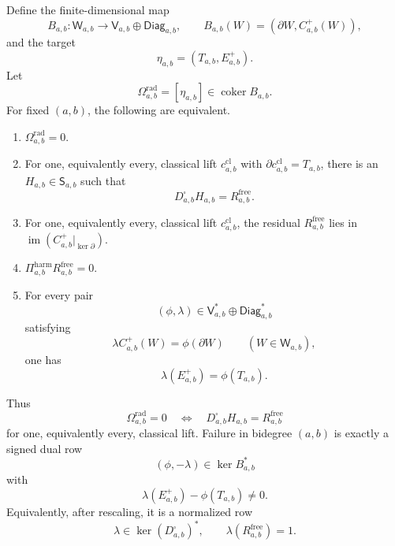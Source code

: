 \begin{prop}
\label{prop:app-radial-dual-potential-obstruction}
  Define the finite-dimensional map
  \[
    B_{a,b}\colon\mathsf W_{a,b}\longrightarrow
    \mathsf V_{a,b}\oplus\mathsf{Diag}_{a,b},
    \qquad
    B_{a,b}(W)=(\partial W,C^+_{a,b}(W)),
  \]
  and the target
  \[
    \eta_{a,b}=(T_{a,b},E^+_{a,b}).
  \]
  Let
  \[
    \Omega^{\mathrm{rad}}_{a,b}
    =
    [\eta_{a,b}]\in\operatorname{coker}B_{a,b}.
  \]
  For fixed \((a,b)\), the following are equivalent.
  \begin{enumerate}
    \item \(\Omega^{\mathrm{rad}}_{a,b}=0\).
    \item For one, equivalently every, classical lift
      \(c^{\mathrm{cl}}_{a,b}\) with
      \(\partial c^{\mathrm{cl}}_{a,b}=T_{a,b}\), there is an
      \(H_{a,b}\in\mathsf S_{a,b}\) such that
      \[
        D^\square_{a,b}H_{a,b}=R^{\mathrm{free}}_{a,b}.
      \]
    \item For one, equivalently every, classical lift
      \(c^{\mathrm{cl}}_{a,b}\), the residual
      \(R^{\mathrm{free}}_{a,b}\) lies in
      \(\operatorname{im}(C^+_{a,b}|_{\ker\partial})\).
    \item \(\Pi^{\mathrm{harm}}_{a,b}R^{\mathrm{free}}_{a,b}=0\).
    \item For every pair
      \[
        (\phi,\lambda)\in
        \mathsf V_{a,b}^*\oplus\mathsf{Diag}_{a,b}^*
      \]
      satisfying
      \[
        \lambda C^+_{a,b}(W)=\phi(\partial W)
        \qquad(W\in\mathsf W_{a,b}),
      \]
      one has
      \[
        \lambda(E^+_{a,b})=\phi(T_{a,b}).
      \]
  \end{enumerate}
  Thus
  \[
    \Omega^{\mathrm{rad}}_{a,b}=0
    \quad\Longleftrightarrow\quad
    D^\square_{a,b}H_{a,b}=R^{\mathrm{free}}_{a,b}
  \]
  for one, equivalently every, classical lift.  Failure in bidegree
  \((a,b)\) is exactly a signed dual row
  \[
    (\phi,-\lambda)\in\ker B_{a,b}^*
  \]
  with
  \[
    \lambda(E^+_{a,b})-\phi(T_{a,b})\ne0.
  \]
  Equivalently, after rescaling, it is a normalized row
  \[
    \lambda\in\ker(D^\square_{a,b})^*,
    \qquad
    \lambda(R^{\mathrm{free}}_{a,b})=1 .
  \]
\end{prop}

